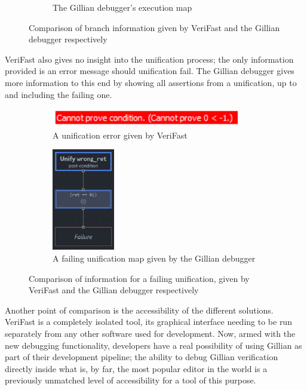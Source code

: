 \begin{figure}
\begin{subfigure}[b]{0.4\textwidth}
    \caption{The Gillian debugger's execution map}%
    \label{fig:execmap-final}
  \end{subfigure}
  \caption{Comparison of branch information given by VeriFast and the Gillian
  debugger respectively}%
  \label{fig:verifast-path-compare}
\end{figure}

VeriFast also gives no insight into the unification process; the only
information provided is an error message should unification fail. The Gillian
debugger gives more information to this end by showing all assertions from
a unification, up to and including the failing one.

\begin{figure}
  \centering
  \begin{subfigure}[b]{0.4\textwidth}
    \center{}
    \includegraphics[width=0.9\textwidth]{img/verifast-error.png}
    \caption{A unification error given by VeriFast}%
    \label{fig:verifast-error}
  \end{subfigure}
  \qquad
  \begin{subfigure}[b]{0.4\textwidth}
    \centering
    \includegraphics[width=0.3\textwidth]{img/unifymap-failure.png}
    \caption{A failing unification map given by the Gillian debugger}%
    \label{fig:unifymap-failure}
  \end{subfigure}
  \caption{Comparison of information for a failing unification, given by
  VeriFast and the Gillian debugger respectively}%
  \label{fig:verifast-unifyfail-compare}
\end{figure}

Another point of comparison is the accessibility of the different solutions.
VeriFast is a completely isolated tool, its graphical interface needing to be
run separately from any other software used for development. Now, armed with the
new debugging functionality, developers have a real possibility of using Gillian
as part of their development pipeline; the ability to debug Gillian verification
directly inside what is, by far, the most popular editor in the world is a
previously unmatched level of accessibility for a tool of this purpose.


